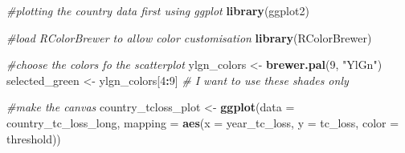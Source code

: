 \documentclass[
]{article}
\newenvironment{Shaded}{\begin{snugshade}}{\end{snugshade}}
\newcommand{\AttributeTok}[1]{\textcolor[rgb]{0.13,0.29,0.53}{#1}}
\newcommand{\CommentTok}[1]{\textcolor[rgb]{0.56,0.35,0.01}{\textit{#1}}}
\newcommand{\DecValTok}[1]{\textcolor[rgb]{0.00,0.00,0.81}{#1}}
\newcommand{\FunctionTok}[1]{\textcolor[rgb]{0.13,0.29,0.53}{\textbf{#1}}}
\newcommand{\NormalTok}[1]{#1}
\newcommand{\OtherTok}[1]{\textcolor[rgb]{0.56,0.35,0.01}{#1}}
\newcommand{\SpecialCharTok}[1]{\textcolor[rgb]{0.81,0.36,0.00}{\textbf{#1}}}
\newcommand{\StringTok}[1]{\textcolor[rgb]{0.31,0.60,0.02}{#1}}
\begin{document}
\begin{Shaded}
\begin{Highlighting}[]
\CommentTok{\#plotting the country data first using ggplot}
\FunctionTok{library}\NormalTok{(ggplot2)}

\CommentTok{\#load RColorBrewer to allow color customisation}
\FunctionTok{library}\NormalTok{(RColorBrewer)}

\CommentTok{\#choose the colors fo the scatterplot}
\NormalTok{ylgn\_colors }\OtherTok{\textless{}{-}} \FunctionTok{brewer.pal}\NormalTok{(}\DecValTok{9}\NormalTok{, }\StringTok{"YlGn"}\NormalTok{)}
\NormalTok{selected\_green }\OtherTok{\textless{}{-}}\NormalTok{ ylgn\_colors[}\DecValTok{4}\SpecialCharTok{:}\DecValTok{9}\NormalTok{] }\CommentTok{\# I want to use these shades only}

\CommentTok{\#make the canvas}
\NormalTok{country\_tcloss\_plot }\OtherTok{\textless{}{-}} \FunctionTok{ggplot}\NormalTok{(}\AttributeTok{data =}\NormalTok{ country\_tc\_loss\_long, }\AttributeTok{mapping =} 
                                \FunctionTok{aes}\NormalTok{(}\AttributeTok{x =}\NormalTok{ year\_tc\_loss, }\AttributeTok{y =}\NormalTok{ tc\_loss, }
                                    \AttributeTok{color =}\NormalTok{ threshold))}


\end{Highlighting}
\end{Shaded}
\end{document}
